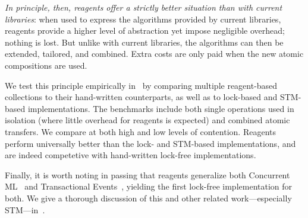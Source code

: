 \documentclass[preprint,nocopyrightspace]{sigplanconf}
\begin{document}
\emph{In principle, then, reagents offer a strictly better situation than with
  current libraries}: when used to express the algorithms provided by current
libraries, reagents provide a higher level of abstraction yet impose negligible
overhead; nothing is lost.  But unlike with current libraries, the algorithms
can then be extended, tailored, and combined.  Extra costs are only paid when
the new atomic compositions are used.  

We test this principle empirically in~ by comparing multiple
reagent-based collections to their hand-written counterparts, as well as to
lock-based and STM-based implementations.  The benchmarks include both single
operations used in isolation (where little overhead for reagents is expected)
and combined atomic transfers.  We compare at both high and low levels of
contention.  Reagents perform universally better than the lock- and STM-based
implementations, and are indeed competetive with hand-written lock-free
implementations.

Finally, it is worth noting in passing that reagents generalize both Concurrent
ML~\cite{Reppy1991} and Transactional Events~\cite{Donnelly2006}, yielding the
first lock-free implementation for both.  We give a thorough discussion of this
and other related work---especially STM---in~.


\end{document}
